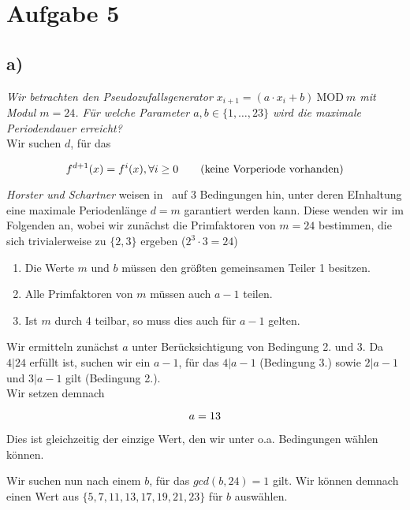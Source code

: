 \chapter{Aufgabe 5}

\section{a)}

\textit{Wir betrachten den Pseudozufallsgenerator $x_{i+1} = (a \cdot x_i + b) \ \text{MOD}\ m$ mit Modul
$m = 24$. Für welche Parameter $a,b \in \{1, \ldots, 23\}$ wird die maximale Periodendauer
erreicht?}\\

\noindent
Wir suchen $d$, für das

\begin{equation}\notag
    f^{d+1}(x) = f^i(x), \forall i \geq 0 \qquad{\text{(keine Vorperiode vorhanden)}}
\end{equation}

\noindent
\textit{Horster und Schartner} weisen in~\cite[83]{ITS3} auf 3 Bedingungen hin, unter deren EInhaltung eine maximale Periodenlänge $d=m$ garantiert werden kann.
Diese wenden wir im Folgenden an, wobei wir zunächst die Primfaktoren von $m = 24$ bestimmen, die sich trivialerweise zu $\{2, 3\}$ ergeben ($2^3 \cdot 3 = 24$)

\begin{enumerate}
    \itemsep0.5em
    \item Die Werte $m$ und $b$ müssen den größten gemeinsamen Teiler 1 besitzen.
    \item Alle Primfaktoren von $m$ müssen auch $a-1$ teilen.
    \item Ist $m$ durch 4 teilbar, so muss dies auch für $a-1$ gelten.
\end{enumerate}

\noindent
Wir ermitteln zunächst $a$ unter Berücksichtigung von Bedingung 2. und 3.
Da $4|24$ erfüllt ist, suchen wir ein $a-1$, für das $4|a-1$ (Bedingung 3.) sowie  $2|a-1$ und $3|a-1$ gilt (Bedingung 2.).\\
Wir setzen demnach

\begin{equation}\notag
    a=13
\end{equation}

\noindent
Dies ist gleichzeitig der einzige Wert, den wir unter o.a. Bedingungen wählen können.

\noindent
Wir suchen nun nach einem $b$, für das $gcd(b, 24) = 1$ gilt.
Wir können demnach einen Wert aus $\{5, 7, 11, 13, 17, 19, 21, 23\}$ für $b$ auswählen.

